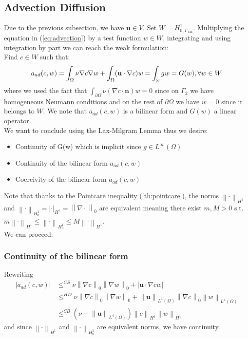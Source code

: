 \documentclass[conference]{IEEEtran}
\newcommand{\norm}[1]{\left\lVert#1\right\rVert}
\begin{document}
\subsection{Advection Diffusion}
Due to the previous subsection, we have $\textbf{u} \in V$. Set $W= H^1_{0,\Gamma_{134}} $. Multiplying the equation in (\ref{eq:advection}) by a test function $w \in W$, integrating and using integration by part we can reach the weak formulation:\\
Find $c \in W$ such that:
\begin{equation}
      a_{ad}(c,w) = \int_\Omega \nu \nabla c \nabla w 
      + \int_\Omega (\textbf{u} \cdot \nabla c) w
      = \int_\omega gw = G(w),  \forall w \in W  \\
    \label{eq:advection_weak}
\end{equation}
where we used the fact that $\int_{\partial\Omega} \nu (\nabla c \cdot \textbf{n}) w = 0$ since on $\Gamma_2$ we have homogeneous Neumann conditions and on the rest of $\partial\Omega$ we have $w=0$ since it belongs to $W$. We note that $a_{ad}(c,w)$ is a bilinear form and $G(w)$ a linear operator.\\
We want to conclude using the Lax-Milgram Lemma thus we desire:
\begin{itemize}
\item Continuity of G(w) which is implicit since $g\in L^{\infty}(\Omega)$
\item Continuity of the bilinear form $a_{ad}(c,w)$
\item Coercivity of the bilinear form $a_{ad}(c,w)$
\end{itemize}
Note that thanks to the Pointcare inequality (\ref{th:pointcare}), the norms $\norm{\cdot}_{H^1}$ and $\norm{\cdot}_{H^1_0}=|\cdot|_{H^1}=\norm{\nabla \cdot}_0$ are equivalent meaning there exist $m,M >0 $ s.t. $m\norm{\cdot}_{H^1} \leq \norm{\cdot}_{H^1_0} \leq M\norm{\cdot}_{H^1}$. \\
We can proceed:
\subsubsection{Continuity of the bilinear form} Rewriting
\begin{align}
	  |a_{ad}(c,w)| 
      & \leq^{CS} \nu \norm{\nabla c}_0 \norm{\nabla w}_0 + | \textbf{u} \cdot \nabla c w | \\
      & \leq^{HD} \nu \norm{\nabla c}_0 \norm{\nabla w}_0 + \norm{\textbf{u}}_{L^4(\Omega)} \norm{\nabla c}_0 \norm{w}_{L^4(\Omega)} \\
      & \leq^{SB} (\nu + \norm{\textbf{u}}_{L^4(\Omega)}) \norm{c}_{H^1} \norm{w}_{H^1}
\end{align}
and since $\norm{\cdot}_{H^1}$ and $\norm{\cdot}_{H^1_0}$ are equivalent norms, we have continuity.
\end{document}
